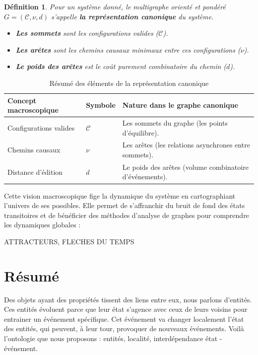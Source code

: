 \documentclass{report}
\newtheorem{definition}{Définition}[section]
\begin{document}
\begin{definition}
	Pour un système donné, le multigraphe orienté et pondéré $G = (\mathcal{C}, \nu, d)$ s'appelle \textbf{la représentation canonique} du système. 
	\begin{itemize}
		\item \textbf{Les sommets} sont les configurations valides ($\mathcal{C}$).
		\item \textbf{Les arêtes} sont les chemins causaux minimaux entre ces configurations ($\nu$).
		\item \textbf{Le poids des arêtes} est le coût purement combinatoire du chemin ($d$).
	\end{itemize}
\end{definition}

\begin{table}[H]
	\centering
	\begin{tabular}{|l|l|l|}
		\hline 
		\textbf{Concept macroscopique} & \textbf{Symbole} & \textbf{Nature dans le graphe canonique} \\
		\hline 
		Configurations valides & $\mathcal{C}$ & Les sommets du graphe (les points d'équilibre). \\
		\hline 
		Chemins causaux & $\nu$ & Les arêtes (les relations asynchrones entre sommets). \\
		\hline 
		Distance d'édition & $d$ & Le poids des arêtes (volume combinatoire d'événements). \\
		\hline 
	\end{tabular}
	\caption{Résumé des éléments de la représentation canonique}
\end{table}

Cette vision macroscopique fige la dynamique du système en cartographiant l'univers de ses possibles. Elle permet de s'affranchir du bruit de fond des états transitoires et de bénéficier des méthodes d'analyse de graphes pour comprendre les dynamiques globales :

ATTRACTEURS, FLECHES DU TEMPS


	\section{Résumé}
	
		Des objets ayant des propriétés tissent des liens entre eux, nous parlons d'entités. Ces entités évoluent parce que leur état s'agence avec ceux de leurs voisins pour entrainer un événement spécifique. Cet événement va changer localement l'état des entités, qui peuvent, à leur tour, provoquer de nouveaux événements. Voilà l'ontologie que nous proposons : entités, localité, interdépendance état - événement. 
		
\end{document}
